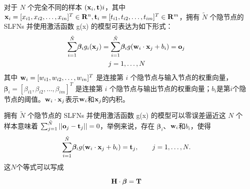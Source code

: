\documentclass[conference]{IEEEtran}
\begin{document}
对于 $N$ 个完全不同的样本 $({\bf x}_i, {\bf t})i$，其中 ${\bf x}_i=[x_{i1},x_{i2},\dots,x_{in}]^T\in{\bf R}^n, {\bf t}_i=[t_{i1},t_{i2},\dots,t_{im}]^T\in{\bf R}^m$，拥有 $\tilde N$ 个隐节点的 SLFNs 并使用激活函数 g(x) 的模型可表达为如下形式：
\begin{equation}\label{eq1}
	\begin{split}
		\overset{\tilde{N}}{\underset{i=1}{\sum}}{{\bm{\beta}}_i}{g_i}({\bf{x}}_j)&=\overset{\tilde{N}}{\underset{i=1}{\sum}}{{\bm{\beta}}_i}g({{\bf{w}}_i}\cdot{{\bf{x}}_j}+b_i)={\bf{o}}_j\\
		&\quad j=1,\dots,N
	\end{split}
\end{equation}
其中 $ {\bf{w}}_i=[w_{i1},w_{i2},\dots,w_{in}]^T $ 是连接第 $i$ 个隐节点与输入节点的权重向量，$ {\bm{\beta}}_i=[\beta_{i1},\beta_{i2},\dots,\beta_{im}]^T $ 是连接第 $i$ 个隐节点与输出节点的权重向量；$b_i$是第$i$个隐节点的阈值。${{\bf{w}}_i}\cdot{{\bf{x}}_j}$表示${{\bf{w}}_i}$和${{\bf{x}}_j}$的内积。

拥有 $\tilde N$ 个隐节点的 SLFNs 并使用激活函数 g(x) 的模型可以零误差逼近这 $N$ 个样本意味着 $\sum^{\tilde{N}}_{j=1}||{\bf{o}}_j-{\bf{t}}_j||=0$，举例来说，存在 $ {\bm{\beta}}_i$、${{\bf{w}}_i}$和$b_i$，使得
\begin{equation}\label{eq2}
	\overset{\tilde{N}}{\underset{i=1}{\sum}}{{\bm{\beta}}_i}g({{\bf{w}}_i}\cdot{{\bf{x}}_j}+b_i)={\bf{t}}_j,\hspace{2em}j=1,\dots,N.
\end{equation}
这$N$个等式可以写成

\begin{equation}\label{eq3}
	{\bf{H}}\cdot{\bm{\beta}}={\bf{T}}
\end{equation}
\end{document}
